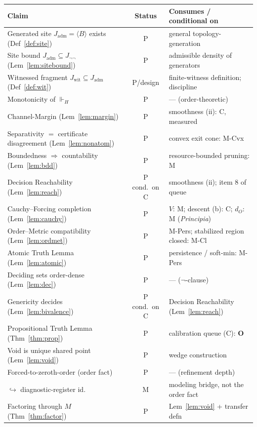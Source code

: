 \documentclass[11pt]{article}
\theoremstyle{definition}
\theoremstyle{remark}
\newcommand{\forcesH}{\Vdash_{H}}
\newcommand{\Jadm}{J_{\mathrm{adm}}}
\newcommand{\Jwit}{J_{\mathrm{wit}}}
\newcommand{\Jnn}{J_{\neg\neg}}
\begin{document}
\begin{center}
\renewcommand{\arraystretch}{1.2}
\begin{tabular}{@{}p{} c p{}@{}}
\toprule
\textbf{Claim} & \textbf{Status} & \textbf{Consumes / conditional on}\\
\midrule
Generated site $\Jadm=\langle B\rangle$ exists (Def~\ref{def:site}) & P & general topology-generation\\
Site bound $\Jadm\subseteq\Jnn$ (Lem~\ref{lem:sitebound}) & P & admissible density of generators\\
Witnessed fragment $\Jwit\subseteq\Jadm$ (Def~\ref{def:wit}) & P/design & finite-witness definition; discipline\\
Monotonicity of $\forcesH$ & P & --- (order-theoretic)\\
Channel-Margin (Lem~\ref{lem:margin}) & P & smoothness (ii): C, measured\\
Separativity $=$ certificate disagreement (Lem~\ref{lem:nonatom}) & P & convex exit cone: M-Cvx\\
Boundedness $\Rightarrow$ countability (Lem~\ref{lem:bdd}) & P & resource-bounded pruning: M\\
Decision Reachability (Lem~\ref{lem:reach}) & P cond.\ on C & smoothness (ii); item 8 of queue\\
Cauchy--Forcing completion (Lem~\ref{lem:cauchy}) & P & $V$: M; descent (b): C; $d_O$: M (\emph{Principia})\\
Order--Metric compatibility (Lem~\ref{lem:ordmet}) & P & M-Pers; stabilized region closed: M-Cl\\
Atomic Truth Lemma (Lem~\ref{lem:atomic}) & P & persistence / soft-min: M-Pers\\
Deciding sets order-dense (Lem~\ref{lem:dec}) & P & --- ($\neg$-clause)\\
Genericity decides (Lem~\ref{lem:bivalence}) & P cond.\ on C & Decision Reachability (Lem~\ref{lem:reach})\\
Propositional Truth Lemma (Thm~\ref{thm:prop}) & P & calibration queue (C): \textbf{O}\\
Void is unique shared point (Lem~\ref{lem:void}) & P & wedge construction\\
Forced-to-zeroth-order (order fact) & P & --- (refinement depth)\\
\;\;$\hookrightarrow$ diagnostic-register id. & M & modeling bridge, not the order fact\\
Factoring through $M$ (Thm~\ref{thm:factor}) & P & Lem~\ref{lem:void} + transfer defn\\

\end{tabular}
\end{center}
\end{document}
